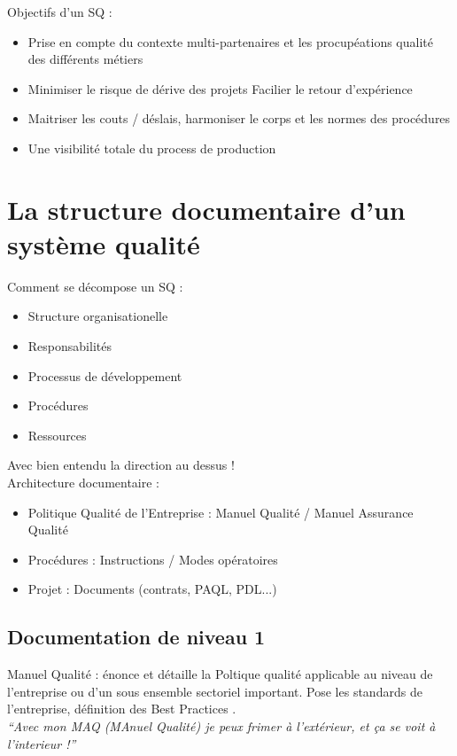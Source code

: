 Objectifs d’un SQ :
\begin{itemize}
\item Prise en compte du contexte multi-partenaires et les procupéations qualité des différents métiers
\item Minimiser le risque de dérive des projets
Facilier le retour d’expérience
\item Maitriser les couts / déslais, harmoniser le corps et les normes des procédures
\item Une visibilité totale du process de production
\end{itemize}

\section{La structure documentaire d’un système qualité}


Comment se décompose un SQ : 
\begin{itemize}
\item Structure organisationelle
\item Responsabilités
\item Processus de développement
\item Procédures 
\item Ressources
\end{itemize}

Avec bien entendu la direction au dessus ! \\

Architecture documentaire :
\begin{itemize}
\item Politique Qualité de l’Entreprise : Manuel Qualité / Manuel Assurance Qualité
\item Procédures : Instructions / Modes opératoires 
\item Projet : Documents (contrats, PAQL, PDL...)
\end{itemize}


	\subsection{Documentation de niveau 1}

Manuel Qualité : énonce et détaille la Poltique qualité applicable au niveau de l’entreprise ou d’un sous ensemble sectoriel important. 
Pose les standards de l’entreprise, définition des Best Practices .\\

\textit{“Avec mon MAQ  (MAnuel Qualité) je peux frimer à l’extérieur, et ça se voit à l’interieur !”}

